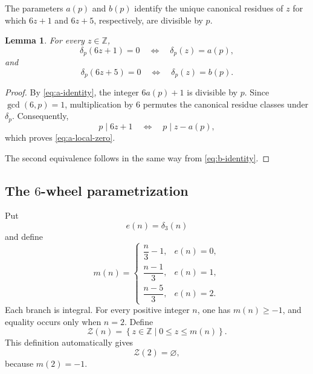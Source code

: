 \documentclass[12pt]{article}
\numberwithin{equation}{section}
\newtheorem{lemma}[theorem]{Lemma}
\theoremstyle{definition}
\theoremstyle{remark}
\newcommand{\Z}{\mathbb Z}
\newcommand{\Zcal}{\mathcal Z}
\begin{document}
The parameters $a(p)$ and $b(p)$ identify the unique canonical
residues of $z$ for which $6z+1$ and $6z+5$, respectively, are
divisible by $p$.

\begin{lemma}
\label{lem:local-zero}
For every $z\in\Z$,
\begin{equation}
\label{eq:a-local-zero}
\delta_p(6z+1)=0
\quad\Longleftrightarrow\quad
\delta_p(z)=a(p),
\end{equation}
and
\begin{equation}
\label{eq:b-local-zero}
\delta_p(6z+5)=0
\quad\Longleftrightarrow\quad
\delta_p(z)=b(p).
\end{equation}
\end{lemma}

\begin{proof}
By \eqref{eq:a-identity}, the integer $6a(p)+1$ is divisible
by $p$. Since $\gcd(6,p)=1$, multiplication by $6$ permutes the
canonical residue classes under $\delta_p$. Consequently,
\[
p\mid6z+1
\quad\Longleftrightarrow\quad
p\mid z-a(p),
\]
which proves \eqref{eq:a-local-zero}.

The second equivalence follows in the same way from
\eqref{eq:b-identity}.
\end{proof}

\subsection{The \texorpdfstring{$6$}{6}-wheel parametrization}

Put
\[
e(n)=\delta_3(n)
\]
and define
\begin{equation}
\label{eq:m-definition}
m(n)
=
\begin{cases}
\dfrac{n}{3}-1,
&
e(n)=0,
\\[6pt]
\dfrac{n-1}{3},
&
e(n)=1,
\\[6pt]
\dfrac{n-5}{3},
&
e(n)=2.
\end{cases}
\end{equation}
Each branch is integral. For every positive integer $n$, one has
$m(n)\geq-1$, and equality occurs only when $n=2$. Define
\begin{equation}
\label{eq:Z-definition}
\Zcal(n)
=
\left\{
z\in\Z
\mathrel{}\middle|\mathrel{}
0\leq z\leq m(n)
\right\}.
\end{equation}
This definition automatically gives
\[
\Zcal(2)=\varnothing,
\]
because $m(2)=-1$.
\end{document}
